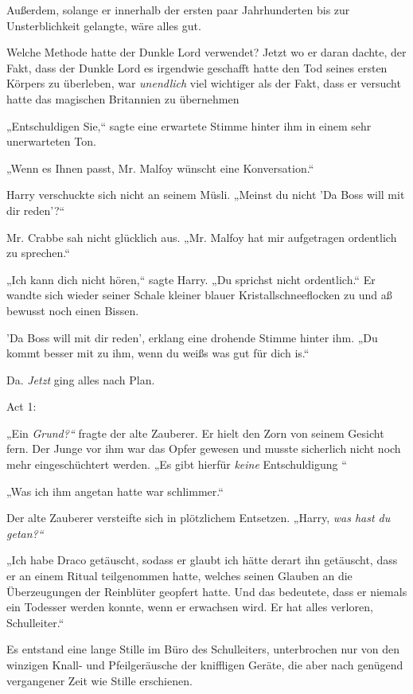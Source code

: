 {Außerdem, solange er innerhalb der ersten paar Jahrhunderten bis zur Unsterblichkeit gelangte, wäre alles gut.

Welche Methode hatte der Dunkle Lord verwendet? Jetzt wo er daran dachte, der Fakt, dass der Dunkle Lord es irgendwie geschafft hatte den Tod seines ersten Körpers zu überleben, war \emph{unendlich} viel wichtiger als der Fakt, dass er versucht hatte das magischen Britannien zu übernehmen \later

„Entschuldigen Sie,“ sagte eine erwartete Stimme hinter ihm in einem sehr unerwarteten Ton.

„Wenn es Ihnen passt, Mr. Malfoy wünscht eine Konversation.“

Harry verschuckte sich nicht an seinem Müsli. „Meinst du nicht 'Da Boss will mit dir reden'?“

Mr. Crabbe sah nicht glücklich aus. „Mr. Malfoy hat mir aufgetragen ordentlich zu sprechen.“

„Ich kann dich nicht hören,“ sagte Harry. „Du sprichst nicht ordentlich.“ Er wandte sich wieder seiner Schale kleiner blauer Kristallschneeflocken zu und aß bewusst noch einen Bissen.

'Da Boss will mit dir reden', erklang eine drohende Stimme hinter ihm. „Du kommt besser mit zu ihm, wenn du weißs was gut für dich is.“

Da. \emph{Jetzt} ging alles nach Plan.

Act 1:

„Ein \emph{Grund?“} fragte der alte Zauberer. Er hielt den Zorn von seinem Gesicht fern. Der Junge vor ihm war das Opfer gewesen und musste sicherlich nicht noch mehr eingeschüchtert werden. „Es gibt hierfür \emph{keine} Entschuldigung \later“

„Was ich ihm angetan hatte war schlimmer.“

Der alte Zauberer versteifte sich in plötzlichem Entsetzen. „Harry, \emph{was hast du getan?“}

„Ich habe Draco getäuscht, sodass er glaubt ich hätte derart ihn getäuscht, dass er an einem Ritual teilgenommen hatte, welches seinen Glauben an die Überzeugungen der Reinblüter geopfert hatte. Und das bedeutete, dass er niemals ein Todesser werden konnte, wenn er erwachsen wird. Er hat alles verloren, Schulleiter.“

Es entstand eine lange Stille im Büro des Schulleiters, unterbrochen nur von den winzigen Knall- und Pfeilgeräusche der kniffligen Geräte, die aber nach genügend vergangener Zeit wie Stille erschienen.

}
